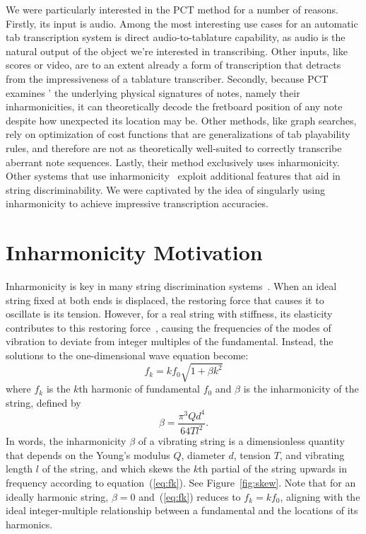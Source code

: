 \documentclass[12pt]{cmuthesis}
\begin{document}
We were particularly interested in the PCT method for a number of reasons. Firstly, its input is audio. Among the most interesting use cases for an automatic tab transcription system is direct audio-to-tablature capability, as audio is the natural output of the object we're interested in transcribing. Other inputs, like scores or video, are to an extent already a form of transcription that detracts from the impressiveness of a tablature transcriber. Secondly, because PCT examines ' the underlying physical signatures of notes, namely their inharmonicities, it can theoretically decode the fretboard position of any note despite how unexpected its location may be. Other methods, like graph searches, rely on optimization of cost functions that are generalizations of tab playability rules, and therefore are not as theoretically well-suited to correctly transcribe aberrant note sequences. Lastly, their method exclusively uses inharmonicity. Other systems that use inharmonicity~\cite{barbancho2009,abesser2012,dittmar2013,kehling2014} exploit additional features that aid in string discriminability. We were captivated by the idea of singularly using inharmonicity to achieve impressive transcription accuracies.

\section{Inharmonicity Motivation}
Inharmonicity is key in many string discrimination systems~\cite{barbancho2009,barbanchoi2012,abesser2012,dittmar2013,kehling2014}. When an ideal string fixed at both ends is displaced, the restoring force that causes it to oscillate is its tension. However, for a real string with stiffness, its elasticity contributes to this restoring force~\cite{fletcher1962}, causing the frequencies of the modes of vibration to deviate from integer multiples of the fundamental. Instead, the solutions to the one-dimensional wave equation become: 
\begin{equation}
\label{eq:fk}
f_k = kf_{0}\sqrt{1+\beta k^2}
\end{equation}
where $f_k$ is the $k$th harmonic of fundamental $f_0$ and $\beta$ is the inharmonicity of the string, defined by
\begin{equation}
\beta = \frac{\pi^3 Q d^4}{64 T l^2}. \label{eq:beta}
\end{equation}
In words, the inharmonicity $\beta$ of a vibrating string is a dimensionless quantity that depends on the Young's modulus $Q$, diameter $d$, tension $T$, and vibrating length $l$ of the string, and which skews the $k$th partial of the string upwards in frequency according to equation~(\ref{eq:fk}). See Figure~\ref{fig:skew}. Note that for an ideally harmonic string, $\beta = 0$ and~(\ref{eq:fk}) reduces to $f_k = kf_0$, aligning with the ideal integer-multiple relationship between a fundamental and the locations of its harmonics.
\end{document}
